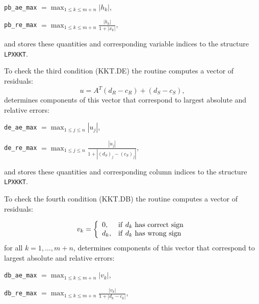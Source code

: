 \medskip

\hspace{30mm}
\verb|pb_ae_max| $\displaystyle{= \max_{1\leq k \leq m+n}|h_k|}$,

\medskip

\hspace{30mm}
\verb|pb_re_max| $\displaystyle{= \max_{1\leq k \leq m+n}
\frac{|h_k|}{1+|x_k|}}$,

\medskip

\noindent
and stores these quantities and corresponding variable indices to the
structure \verb|LPXKKT|.

To check the third condition (KKT.DE) the routine computes a vector of
residuals:
$$u = A^T (d_R - c_R) + (d_S - c_S),$$
determines components of this vector that correspond to largest
absolute and relative errors:

\medskip

\hspace{30mm}
\verb|de_ae_max| $\displaystyle{= \max_{1\leq j\leq n}|u_j|}$,

\medskip

\hspace{30mm}
\verb|de_re_max| $\displaystyle{= \max_{1\leq j\leq n}
\frac{|u_j|}{1+|(d_S)_j - (c_S)_j|}}$,

\medskip

\noindent
and stores these quantities and corresponding column indices to the
structure \verb|LPXKKT|.

To check the fourth condition (KKT.DB) the routine computes a vector
of residuals:

$$
v_k = \left\{
\begin{array}{ll}
0,         & {\rm if}\ d_k\ {\rm has\ correct\ sign} \\
d_k,       & {\rm if}\ d_k\ {\rm has\ wrong\ sign} \\
\end{array}
\right.
$$
for all $k=1,\dots,m+n$, determines components of this vector that
correspond to largest absolute and relative errors:

\medskip

\hspace{30mm}
\verb|db_ae_max| $\displaystyle{= \max_{1\leq k\leq m+n}|v_k|}$,

\medskip

\hspace{30mm}
\verb|db_re_max| $\displaystyle{= \max_{1\leq k\leq m+n}
\frac{|v_k|}{1+|d_k - c_k|}}$,

\medskip

